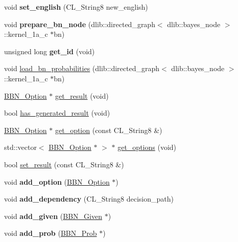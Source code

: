 \begin{DoxyCompactItemize}
\item 
\hypertarget{classBBN__Decision_a5550f09fc957d40109f3ffa34c858478}{
void {\bfseries set\_\-english} (CL\_\-String8 new\_\-english)}
\label{classBBN__Decision_a5550f09fc957d40109f3ffa34c858478}

\item 
\hypertarget{classBBN__Decision_afc6cf50aaf904ec0bf34eae13cc2d91a}{
void {\bfseries prepare\_\-bn\_\-node} (dlib::directed\_\-graph$<$ dlib::bayes\_\-node $>$::kernel\_\-1a\_\-c $\ast$bn)}
\label{classBBN__Decision_afc6cf50aaf904ec0bf34eae13cc2d91a}

\item 
\hypertarget{classBBN__Decision_a92e0f50bb7815b9ae1c7c0e0bab80c27}{
unsigned long {\bfseries get\_\-id} (void)}
\label{classBBN__Decision_a92e0f50bb7815b9ae1c7c0e0bab80c27}

\item 
void \hyperlink{classBBN__Decision_a1a4ff92ffa1b4c3abba092b07d6f9b93}{load\_\-bn\_\-probabilities} (dlib::directed\_\-graph$<$ dlib::bayes\_\-node $>$::kernel\_\-1a\_\-c $\ast$bn)
\item 
\hyperlink{classBBN__Option}{BBN\_\-Option} $\ast$ \hyperlink{classBBN__Decision_aea433e9e244fdbd7c11135b738e0476b}{get\_\-result} (void)
\item 
bool \hyperlink{classBBN__Decision_a2e3f0320f1016c3e35c5730fa5c948e7}{has\_\-generated\_\-result} (void)
\item 
\hyperlink{classBBN__Option}{BBN\_\-Option} $\ast$ \hyperlink{classBBN__Decision_af9e18c8e8e86f2e8e989928c8066a92c}{get\_\-option} (const CL\_\-String8 \&)
\item 
std::vector$<$ \hyperlink{classBBN__Option}{BBN\_\-Option} $\ast$ $>$ $\ast$ \hyperlink{classBBN__Decision_a66f57c1bf4d3efe58c30ea737835d67a}{get\_\-options} (void)
\item 
bool \hyperlink{classBBN__Decision_a3684f85ac9f3047bbd3ef57b1eaf7e3d}{set\_\-result} (const CL\_\-String8 \&)
\item 
\hypertarget{classBBN__Decision_afc979a53919de0f05fde87d0acd88775}{
void {\bfseries add\_\-option} (\hyperlink{classBBN__Option}{BBN\_\-Option} $\ast$)}
\label{classBBN__Decision_afc979a53919de0f05fde87d0acd88775}

\item 
\hypertarget{classBBN__Decision_acbdd5618f76fd84f3f71d017ae1119c1}{
void {\bfseries add\_\-dependency} (CL\_\-String8 decision\_\-path)}
\label{classBBN__Decision_acbdd5618f76fd84f3f71d017ae1119c1}

\item 
\hypertarget{classBBN__Decision_a0d554f4d8df133d2bc5d673b25472d9f}{
void {\bfseries add\_\-given} (\hyperlink{classBBN__Given}{BBN\_\-Given} $\ast$)}
\label{classBBN__Decision_a0d554f4d8df133d2bc5d673b25472d9f}

\item 
\hypertarget{classBBN__Decision_ab0313b6918df79389132d97b63c9b897}{
void {\bfseries add\_\-prob} (\hyperlink{classBBN__Prob}{BBN\_\-Prob} $\ast$)}
\label{classBBN__Decision_ab0313b6918df79389132d97b63c9b897}

\end{DoxyCompactItemize}


